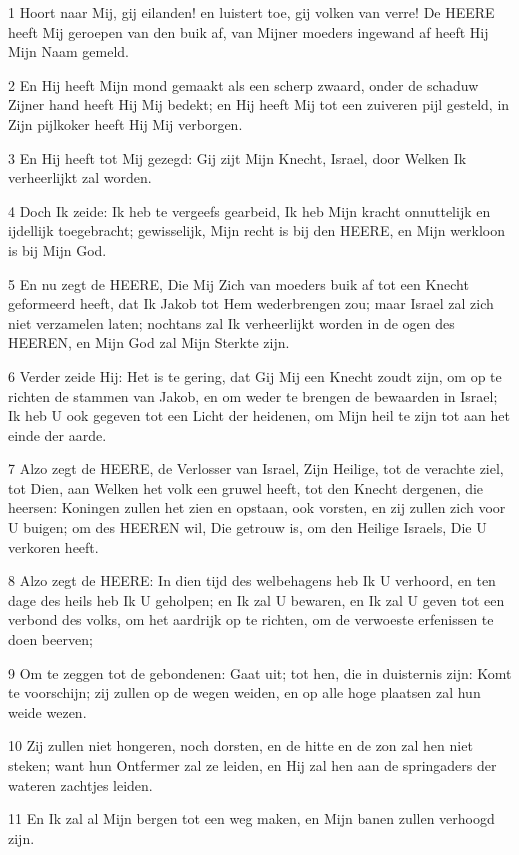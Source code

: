 \par 1 Hoort naar Mij, gij eilanden! en luistert toe, gij volken van verre! De HEERE heeft Mij geroepen van den buik af, van Mijner moeders ingewand af heeft Hij Mijn Naam gemeld.
\par 2 En Hij heeft Mijn mond gemaakt als een scherp zwaard, onder de schaduw Zijner hand heeft Hij Mij bedekt; en Hij heeft Mij tot een zuiveren pijl gesteld, in Zijn pijlkoker heeft Hij Mij verborgen.
\par 3 En Hij heeft tot Mij gezegd: Gij zijt Mijn Knecht, Israel, door Welken Ik verheerlijkt zal worden.
\par 4 Doch Ik zeide: Ik heb te vergeefs gearbeid, Ik heb Mijn kracht onnuttelijk en ijdellijk toegebracht; gewisselijk, Mijn recht is bij den HEERE, en Mijn werkloon is bij Mijn God.
\par 5 En nu zegt de HEERE, Die Mij Zich van moeders buik af tot een Knecht geformeerd heeft, dat Ik Jakob tot Hem wederbrengen zou; maar Israel zal zich niet verzamelen laten; nochtans zal Ik verheerlijkt worden in de ogen des HEEREN, en Mijn God zal Mijn Sterkte zijn.
\par 6 Verder zeide Hij: Het is te gering, dat Gij Mij een Knecht zoudt zijn, om op te richten de stammen van Jakob, en om weder te brengen de bewaarden in Israel; Ik heb U ook gegeven tot een Licht der heidenen, om Mijn heil te zijn tot aan het einde der aarde.
\par 7 Alzo zegt de HEERE, de Verlosser van Israel, Zijn Heilige, tot de verachte ziel, tot Dien, aan Welken het volk een gruwel heeft, tot den Knecht dergenen, die heersen: Koningen zullen het zien en opstaan, ook vorsten, en zij zullen zich voor U buigen; om des HEEREN wil, Die getrouw is, om den Heilige Israels, Die U verkoren heeft.
\par 8 Alzo zegt de HEERE: In dien tijd des welbehagens heb Ik U verhoord, en ten dage des heils heb Ik U geholpen; en Ik zal U bewaren, en Ik zal U geven tot een verbond des volks, om het aardrijk op te richten, om de verwoeste erfenissen te doen beerven;
\par 9 Om te zeggen tot de gebondenen: Gaat uit; tot hen, die in duisternis zijn: Komt te voorschijn; zij zullen op de wegen weiden, en op alle hoge plaatsen zal hun weide wezen.
\par 10 Zij zullen niet hongeren, noch dorsten, en de hitte en de zon zal hen niet steken; want hun Ontfermer zal ze leiden, en Hij zal hen aan de springaders der wateren zachtjes leiden.
\par 11 En Ik zal al Mijn bergen tot een weg maken, en Mijn banen zullen verhoogd zijn.
